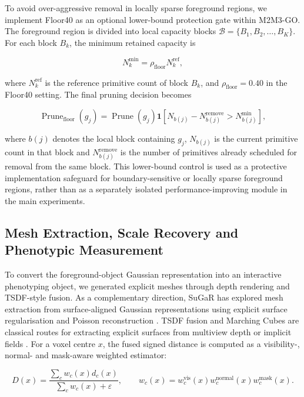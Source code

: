 \documentclass[a4paper]{cas-sc}
\begin{document}
To avoid over-aggressive removal in locally sparse foreground regions, we implement Floor40 as an optional lower-bound protection gate within M2M3-GO. The foreground region is divided into local capacity blocks \(\mathcal{B}=\{B_1,B_2,\ldots,B_K\}\). For each block \(B_k\), the minimum retained capacity is

\[
N_k^{\min}=\rho_{\text{floor}}N_k^{\text{ref}},
\]

where \(N_k^{\text{ref}}\) is the reference primitive count of block \(B_k\), and \(\rho_{\text{floor}}=0.40\) in the Floor40 setting. The final pruning decision becomes

\[
\operatorname{Prune}_{\text{floor}}(g_j)=
\operatorname{Prune}(g_j)
\mathbf{1}
\left[
N_{b(j)}-N_{b(j)}^{\text{remove}}>N_{b(j)}^{\min}
\right],
\]

where \(b(j)\) denotes the local block containing \(g_j\), \(N_{b(j)}\) is the current primitive count in that block and \(N_{b(j)}^{\text{remove}}\) is the number of primitives already scheduled for removal from the same block. This lower-bound control is used as a protective implementation safeguard for boundary-sensitive or locally sparse foreground regions, rather than as a separately isolated performance-improving module in the main experiments.


\subsection{Mesh Extraction, Scale Recovery and Phenotypic Measurement}\label{sec:mesh-extraction-scale-recovery-and-pheno}

To convert the foreground-object Gaussian representation into an interactive phenotyping object, we generated explicit meshes through depth rendering and TSDF-style fusion. As a complementary direction, SuGaR has explored mesh extraction from surface-aligned Gaussian representations using explicit surface regularisation and Poisson reconstruction \cite{ref29}. TSDF fusion and Marching Cubes are classical routes for extracting explicit surfaces from multiview depth or implicit fields \cite{ref45,ref46}. For a voxel centre \(x\), the fused signed distance is computed as a visibility-, normal- and mask-aware weighted estimator:

\[
D(x)=\frac{\sum_c w_c(x)d_c(x)}{\sum_c w_c(x)+\varepsilon},
\qquad
w_c(x)=w_c^{\text{vis}}(x)w_c^{\text{normal}}(x)w_c^{\text{mask}}(x).
\]
\end{document}
